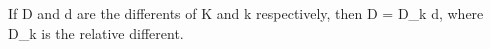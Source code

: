 If D and d are the differents of K and k respectively, then D = D_k d, where D_k is the relative different.
